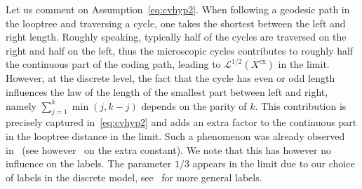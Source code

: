 \documentclass[british, a4paper,11pt]{article}
\numberwithin{equation}{section}
\theoremstyle{definition}
\newcommand{\Loop}{\mathscr{L}}
\newcommand{\exc}{\mathrm{ex}}
\begin{document}
Let us comment on Assumption~\eqref{eq:cvhyp2}.
When following a geodesic path in the looptree and traversing a cycle, one takes the shortest between the left and right length. Roughly speaking, typically half of the cycles are traversed on the right and half on the left, thus the microscopic cycles contributes to roughly half the continuous part of the coding path, leading to $\Loop^{1/2}(X^{\exc})$ in the limit.
However, at the discrete level, the fact that the cycle has even or odd length influences the law of the length of the smallest part between left and right, namely $\sum_{j=1}^k \min(j, k-j)$ depends on the parity of $k$. This contribution is precisely captured in~\eqref{eq:cvhyp2} and adds an extra factor to the continuous part in the looptree distance in the limit. Such a phenomenon was already observed in~\cite[Theorem~1.2]{KR20} (see however~\cite[Remark~7.7]{Mar24} on the extra constant).
We note that this 
has however no influence on the labels. The parameter $1/3$ appears in the limit due to our choice of labels in the discrete model, see~\cite[Theorem~7.9]{Mar24} for more general labels.
\end{document}

